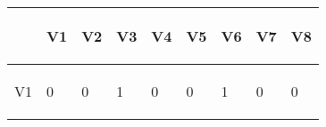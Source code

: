 \documentclass{article}
\begin{document}
\newpage
\begin{center}

\begin{table}[!h]
        \centering
        
\begin{tabular}{|p{}|p{}|p{}|p{}|p{}|p{}|p{}|p{}|p{}|}
\hline 
 \begin{center}
\end{center}
 & \begin{center}
V1
\end{center}
 & \begin{center}
V2
\end{center}
 & \begin{center}
V3
\end{center}
 & \begin{center}
V4
\end{center}
 & \begin{center}
V5
\end{center}
 & \begin{center}
V6
\end{center}
 & \begin{center}
V7
\end{center}
 & \begin{center}
V8
\end{center}
 \\
\hline 
 \begin{center}
V1
\end{center}
 & \begin{center}
0
\end{center}
 & \begin{center}
0
\end{center}
 & \begin{center}
1
\end{center}
 & \begin{center}
0
\end{center}
 & \begin{center}
0
\end{center}
 & \begin{center}
1
\end{center}
 & \begin{center}
0
\end{center}
 & \begin{center}
0
\end{center}
 \\
\hline 

\end{tabular}
\end{table}
\end{center}
\end{document}
